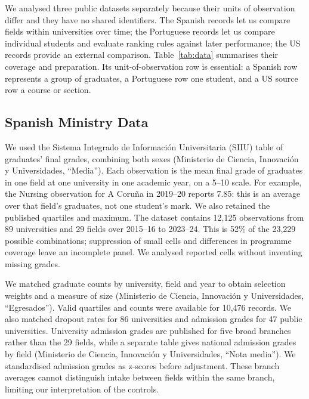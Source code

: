 We analysed three public datasets separately because their units of observation differ and they have no shared identifiers. The Spanish records let us compare fields within universities over time; the Portuguese records let us compare individual students and evaluate ranking rules against later performance; the US records provide an external comparison. Table~\ref{tab:data} summarises their coverage and preparation. Its unit-of-observation row is essential: a Spanish row represents a group of graduates, a Portuguese row one student, and a US source row a course or section.



\subsection{Spanish Ministry Data}
\label{sec:data-spain}

We used the Sistema Integrado de Informaci\'on Universitaria (SIIU) table of graduates' final grades, combining both sexes (Ministerio de Ciencia, Innovaci\'on y Universidades, ``Media''). Each observation is the mean final grade of graduates in one field at one university in one academic year, on a 5--10 scale. For example, the Nursing observation for A Coru\~na in 2019--20 reports 7.85: this is an average over that field's graduates, not one student's mark. We also retained the published quartiles and maximum. The dataset contains 12,125 observations from 89 universities and 29 fields over 2015--16 to 2023--24. This is 52\% of the 23,229 possible combinations; suppression of small cells and differences in programme coverage leave an incomplete panel. We analysed reported cells without inventing missing grades.

We matched graduate counts by university, field and year to obtain selection weights and a measure of size (Ministerio de Ciencia, Innovaci\'on y Universidades, ``Egresados''). Valid quartiles and counts were available for 10,476 records. We also matched dropout rates for 86 universities and admission grades for 47 public universities. University admission grades are published for five broad branches rather than the 29 fields, while a separate table gives national admission grades by field (Ministerio de Ciencia, Innovaci\'on y Universidades, ``Nota media''). We standardised admission grades as z-scores before adjustment. These branch averages cannot distinguish intake between fields within the same branch, limiting our interpretation of the controls.

